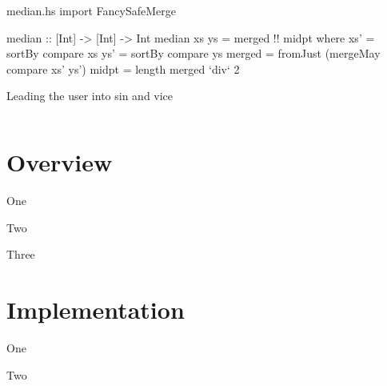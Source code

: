 \documentclass{beamer}
\begin{document}
\begin{filecontents*}{median.hs}
import FancySafeMerge

median :: [Int] -> [Int] -> Int
median xs ys = merged !! midpt
  where
    xs'    = sortBy compare xs
    ys'    = sortBy compare ys
    merged = fromJust (mergeMay compare xs' ys')
    midpt  = length merged `div` 2
\end{filecontents*}
\begin{frame}{Leading the user into sin and vice}
\inputminted{haskell}{median.hs}
\end{frame}


  \section{Overview}   %

\begin{frame}{One}
\end{frame}


\begin{frame}{Two}
\end{frame}


\begin{frame}{Three}
\end{frame}

  \section{Implementation}   %

\begin{frame}{One}

\end{frame}

\begin{frame}{Two}

\end{frame}
\end{document}
